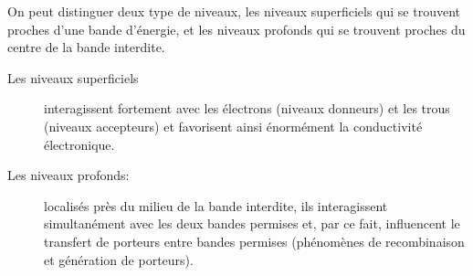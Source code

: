 On peut distinguer deux type de niveaux, les niveaux superficiels qui se trouvent proches d'une bande d'énergie, et les niveaux profonds qui se trouvent proches du centre de la bande interdite. 
\begin{description}
\item[Les niveaux superficiels] interagissent fortement avec les électrons (niveaux donneurs) et les trous (niveaux accepteurs) et favorisent ainsi énormément la conductivité électronique.
\item[Les niveaux profonds: ] localisés près du milieu de la bande interdite, ils interagissent simultanément avec les deux bandes permises et, par ce fait, influencent le transfert de porteurs entre bandes permises (phénomènes de recombinaison et génération de porteurs). 
\end{description}

